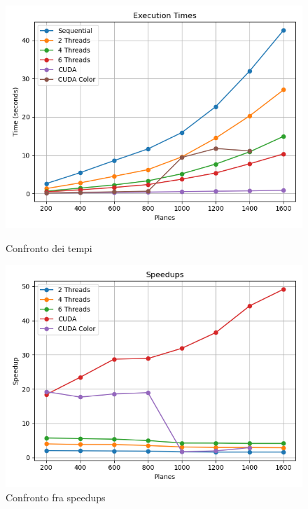 \documentclass[11pt]{article}
\begin{document}
    \begin{figure}[H]
        \centering
        \begin{minipage}{0.49\textwidth}
            \centering
            \includegraphics[width=\textwidth]{plots/1024/results_times}
            \caption{Confronto dei tempi}\label{fig:tempi-1024}
        \end{minipage}
        \begin{minipage}{0.49\textwidth}
            \centering
            \includegraphics[width=\textwidth]{plots/1024/results_speedup}
            \caption{Confronto fra speedups}\label{fig:speedups-1024}
        \end{minipage}
    \end{figure}
\end{document}
